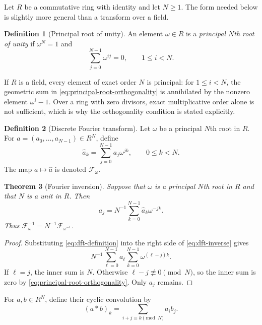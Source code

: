 \documentclass[11pt]{book}
\newtheorem{theorem}{Theorem}[section]
\theoremstyle{definition}
\newtheorem{definition}[theorem]{Definition}
\begin{document}
Let $R$ be a commutative ring with identity and let $N\geq1$.  The form needed
below is slightly more general than a transform over a field.

\begin{definition}[Principal root of unity]
An element $\omega\in R$ is a \emph{principal $N$th root of unity} if
$\omega^N=1$ and
\begin{equation}\label{eq:principal-root-orthogonality}
 \sum_{j=0}^{N-1}\omega^{ij}=0,
 \qquad 1\leq i<N.
\end{equation}
\end{definition}

If $R$ is a field, every element of exact order $N$ is principal: for
$1\leq i<N$, the geometric sum in
\eqref{eq:principal-root-orthogonality} is annihilated by the nonzero element
$\omega^i-1$.  Over a ring with zero divisors, exact multiplicative order alone
is not sufficient, which is why the orthogonality condition is stated
explicitly.

\begin{definition}[Discrete Fourier transform]
Let $\omega$ be a principal $N$th root in $R$.  For
$a=(a_0,\ldots,a_{N-1})\in R^N$, define
\begin{equation}\label{eq:dft-definition}
 \widehat a_k=\sum_{j=0}^{N-1}a_j\omega^{jk},
 \qquad 0\leq k<N.
\end{equation}
The map $a\mapsto\widehat a$ is denoted $\mathcal F_\omega$.
\end{definition}

\begin{theorem}[Fourier inversion]\label{thm:ring-dft-inversion}
Suppose that $\omega$ is a principal $N$th root in $R$ and that $N$ is a unit
in $R$.  Then
\begin{equation}\label{eq:dft-inverse}
 a_j=N^{-1}\sum_{k=0}^{N-1}\widehat a_k\omega^{-jk}.
\end{equation}
Thus $\mathcal F_\omega^{-1}=N^{-1}\mathcal F_{\omega^{-1}}$.
\end{theorem}

\begin{proof}
Substituting \eqref{eq:dft-definition} into the right side of
\eqref{eq:dft-inverse} gives
\[
 N^{-1}\sum_{\ell=0}^{N-1}a_\ell
 \sum_{k=0}^{N-1}\omega^{(\ell-j)k}.
\]
If $\ell=j$, the inner sum is $N$.  Otherwise
$\ell-j\not\equiv0\pmod N$, so the inner sum is zero by
\eqref{eq:principal-root-orthogonality}.  Only $a_j$ remains.
\end{proof}

For $a,b\in R^N$, define their cyclic convolution by
\begin{equation}\label{eq:cyclic-convolution}
 (a*b)_k=\sum_{i+j\equiv k\pmod N}a_i b_j.
\end{equation}
\end{document}
